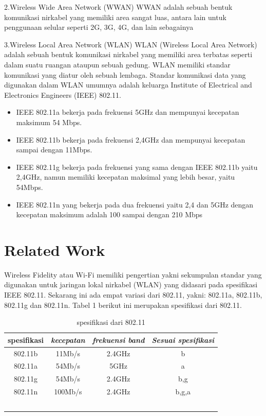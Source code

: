 \documentclass[conference]{IEEEtran}
\begin{document}
2.Wireless Wide Area Network (WWAN)
WWAN adalah sebuah bentuk komunikasi nirkabel yang memiliki area sangat luas, antara lain untuk penggunaan selular seperti 2G, 3G, 4G, dan lain sebagainya
\vspace{5pt}

3.Wireless Local Area Network (WLAN)
WLAN (Wireless Local Area Network) adalah sebuah bentuk komunikasi nirkabel yang memiliki area terbatas seperti dalam suatu ruangan ataupun sebuah gedung. WLAN memiliki standar komunikasi yang diatur oleh sebuah lembaga. Standar komunikasi data yang digunakan dalam WLAN umumnya adalah keluarga Institute of Electrical and Electronics Engineers (IEEE) 802.11.
\begin{itemize}
    \item  IEEE 802.11a bekerja pada frekuensi 5GHz dan mempunyai kecepatan maksimum 54 Mbps.
    \item IEEE 802.11b bekerja pada frekuensi 2,4GHz dan mempunyai kecepatan sampai dengan 11Mbps.
    \item IEEE 802.11g bekerja pada frekuensi yang sama dengan IEEE 802.11b yaitu 2,4GHz, namun memiliki kecepatan maksimal yang lebih besar, yaitu 54Mbps.
    \item   IEEE 802.11n yang bekerja pada dua frekuensi yaitu 2,4 dan 5GHz dengan kecepatan maksimum adalah 100 sampai dengan 210 Mbps
\end{itemize}
\vspace{0.1pt}

\section{Related Work}
\vspace{0.1pt}

Wireless Fidelity atau Wi-Fi memiliki pengertian yakni sekumpulan standar yang digunakan untuk jaringan lokal nirkabel (WLAN) yang didasari pada spesifikasi IEEE 802.11. Sekarang ini ada empat variasi dari 802.11, yakni: 802.11a, 802.11b, 802.11g dan 802.11n. Tabel 1 berikut ini merupakan spesifikasi dari 802.11.
\begin{table}[htbp]
    \caption{spesifikasi dari 802.11}
    \begin{center}
    \begin{tabular}{|c|c|c|c|}
        \hline
    \textbf{spesifikasi} & \textbf{\textit{kecepatan}}& \textbf{\textit{frekuensi band}}& \textbf{\textit{Sesuai spesifikasi}} \\
    \hline
    802.11b & 11Mb/s & 2.4GHz & b  \\
    \hline
    802.11a & 54Mb/s & 5GHz & a  \\
    \hline
    802.11g & 54Mb/s & 2.4GHz & b,g  \\
    \hline
    802.11n & 100Mb/s & 2.4GHz & b,g,a  \\
    \hline
    \multicolumn{4}{l}{$^{\mathrm{}}$}
    \end{tabular}
    \label{tab1}
    \end{center}
    \end{table}
    
\end{document}
